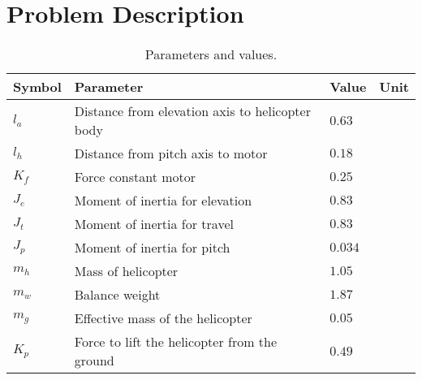 \section{Problem Description}\label{sec:prob_descr}

\begin{table}[p]
	\centering
	\caption{Parameters and values.}
	\begin{tabular}{llll}
		\hline
		Symbol & Parameter & Value & Unit \\
		\hline
		$l_a$ & Distance from elevation axis to helicopter body & $0.63$ & \meter \\
		$l_h$ & Distance from pitch axis to motor & $0.18$ & \meter \\
		$K_f$ & Force constant motor & $0.25$ & \newton\per\volt \\
		$J_e$ & Moment of inertia for elevation & $0.83$ & \kilogram\usk\square\meter \\
		$J_t$ & Moment of inertia for travel & $0.83$ & \kilogram\usk\square\meter \\
		$J_p$ & Moment of inertia for pitch & $0.034$ & \kilogram\usk\square\meter \\
		$m_h$ & Mass of helicopter & $1.05$ & \kilogram \\
		$m_w$ & Balance weight & $1.87$ & \kilogram \\
		$m_g$ & Effective mass of the helicopter & $0.05$ & \kilogram \\
		$K_p$ & Force to lift the helicopter from the ground & $0.49$ & \newton \\
		\hline
	\end{tabular}
	\label{tab:parameters}
\end{table}

